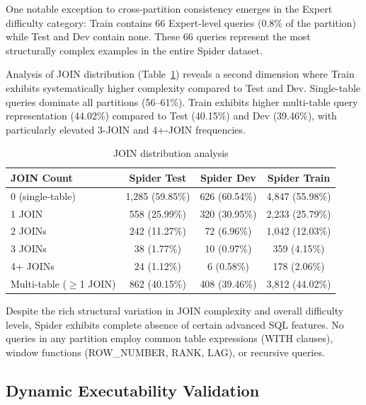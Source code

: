 \documentclass[print]{einformatica}
\begin{document}
One notable exception to cross-partition consistency emerges in the Expert difficulty category: Train contains 66 Expert-level queries (0.8\% of the partition) while Test and Dev contain none. These 66 queries represent the most structurally complex examples in the entire Spider dataset.

Analysis of JOIN distribution (Table~\ref{tab:joins}) reveals a second dimension where Train exhibits systematically higher complexity compared to Test and Dev. Single-table queries dominate all partitions (56--61\%). Train exhibits higher multi-table query representation (44.02\%) compared to Test (40.15\%) and Dev (39.46\%), with particularly elevated 3-JOIN and 4+-JOIN frequencies.

\begin{table}[ht]
    \caption{JOIN distribution analysis}
    \label{tab:joins}
    \centering
    \footnotesize
    \begin{tabular}{lccc}
        \toprule
        \textbf{JOIN Count} & \textbf{Spider Test} & \textbf{Spider Dev} & \textbf{Spider Train} \\
        \midrule
        0 (single-table) & 1,285 (59.85\%) & 626 (60.54\%) & 4,847 (55.98\%) \\
        1 JOIN & 558 (25.99\%) & 320 (30.95\%) & 2,233 (25.79\%) \\
        2 JOINs & 242 (11.27\%) & 72 (6.96\%) & 1,042 (12.03\%) \\
        3 JOINs & 38 (1.77\%) & 10 (0.97\%) & 359 (4.15\%) \\
        4+ JOINs & 24 (1.12\%) & 6 (0.58\%) & 178 (2.06\%) \\
        Multi-table ($\ge$1 JOIN) & 862 (40.15\%) & 408 (39.46\%) & 3,812 (44.02\%) \\
        \bottomrule
    \end{tabular}
\end{table}

Despite the rich structural variation in JOIN complexity and overall difficulty levels, Spider exhibits complete absence of certain advanced SQL features. No queries in any partition employ common table expressions (WITH clauses), window functions (ROW\_NUMBER, RANK, LAG), or recursive queries.

\FloatBarrier
\subsection{Dynamic Executability Validation}\label{sec:execution_results}
\end{document}
